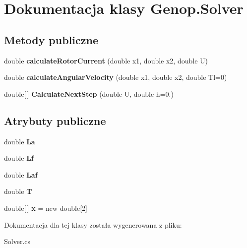 \hypertarget{classGenop_1_1Solver}{}\section{Dokumentacja klasy Genop.\+Solver}
\label{classGenop_1_1Solver}
\subsection*{Metody publiczne}
\begin{DoxyCompactItemize}
\item 
double {\bfseries calculate\+Rotor\+Current} (double x1, double x2, double U)\hypertarget{classGenop_1_1Solver_a284e2f18385857212e8a2cc38f14c155}{}\label{classGenop_1_1Solver_a284e2f18385857212e8a2cc38f14c155}

\item 
double {\bfseries calculate\+Angular\+Velocity} (double x1, double x2, double Tl=0)\hypertarget{classGenop_1_1Solver_ac40d9b2668f551bfc3c4e2b5f054012a}{}\label{classGenop_1_1Solver_ac40d9b2668f551bfc3c4e2b5f054012a}

\item 
double\mbox{[}$\,$\mbox{]} {\bfseries Calculate\+Next\+Step} (double U, double h=0.)\hypertarget{classGenop_1_1Solver_ad03d8a897aa8db437cc46b54872e021d}{}\label{classGenop_1_1Solver_ad03d8a897aa8db437cc46b54872e021d}

\end{DoxyCompactItemize}
\subsection*{Atrybuty publiczne}
\begin{DoxyCompactItemize}
\item 
double {\bfseries La}\hypertarget{classGenop_1_1Solver_a6d1c056f0852c4ff60804fb5ffee2bcc}{}\label{classGenop_1_1Solver_a6d1c056f0852c4ff60804fb5ffee2bcc}

\item 
double {\bfseries Lf}\hypertarget{classGenop_1_1Solver_a8f9b37a235ba4f5d508ed939ca920a6d}{}\label{classGenop_1_1Solver_a8f9b37a235ba4f5d508ed939ca920a6d}

\item 
double {\bfseries Laf}\hypertarget{classGenop_1_1Solver_a94d64291faa7206ef19499dc468afc5e}{}\label{classGenop_1_1Solver_a94d64291faa7206ef19499dc468afc5e}

\item 
double {\bfseries T}\hypertarget{classGenop_1_1Solver_a4b843e4fbca0a421ece8fffb4f59236f}{}\label{classGenop_1_1Solver_a4b843e4fbca0a421ece8fffb4f59236f}

\item 
double\mbox{[}$\,$\mbox{]} {\bfseries x} = new double\mbox{[}2\mbox{]}\hypertarget{classGenop_1_1Solver_ac15052491c6a89063cf8c6b679552c3b}{}\label{classGenop_1_1Solver_ac15052491c6a89063cf8c6b679552c3b}

\end{DoxyCompactItemize}


Dokumentacja dla tej klasy została wygenerowana z pliku\+:\begin{DoxyCompactItemize}
\item 
Solver.\+cs\end{DoxyCompactItemize}
